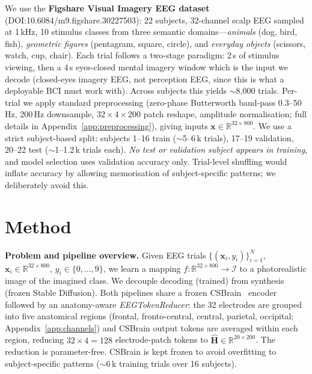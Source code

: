 \documentclass{article}
\begin{document}
We use the \textbf{Figshare Visual Imagery EEG dataset}~\citep{figshare_eeg} (DOI:10.6084/m9.figshare.30227503): 22 subjects, 32-channel scalp EEG sampled at 1\,kHz, 10 stimulus classes from three semantic domains---\emph{animals} (dog, bird, fish), \emph{geometric figures} (pentagram, square, circle), and \emph{everyday objects} (scissors, watch, cup, chair). Each trial follows a two-stage paradigm: 2\,s of stimulus viewing, then a 4\,s eyes-closed mental imagery window which is the input we decode (closed-eyes imagery EEG, not perception EEG, since this is what a deployable BCI must work with). Across subjects this yields $\sim$8{,}000 trials. Per-trial we apply standard preprocessing (zero-phase Butterworth band-pass 0.3--50\,Hz, 200\,Hz downsample, $32{\times}4{\times}200$ patch reshape, amplitude normalisation; full details in Appendix~\ref{app:preprocessing}), giving inputs $\mathbf{x}\in\mathbb{R}^{32\times 800}$. We use a strict subject-based split: subjects 1--16 train ($\sim$5--6\,k trials), 17--19 validation, 20--22 test ($\sim$1--1.2\,k trials each). \emph{No test or validation subject appears in training}, and model selection uses validation accuracy only. Trial-level shuffling would inflate accuracy by allowing memorisation of subject-specific patterns; we deliberately avoid this.

\section{Method}

\textbf{Problem and pipeline overview.} Given EEG trials $\{(\mathbf{x}_i,y_i)\}_{i=1}^N$, $\mathbf{x}_i\in\mathbb{R}^{32\times 800}$, $y_i\in\{0,\dots,9\}$, we learn a mapping $f:\mathbb{R}^{32\times 800}\to\mathcal{I}$ to a photorealistic image of the imagined class. We decouple decoding (trained) from synthesis (frozen Stable Diffusion). Both pipelines share a frozen CSBrain~\citep{zhu2024csbrain} encoder followed by an anatomy-aware \emph{EEGTokenReducer}: the 32 electrodes are grouped into five anatomical regions (frontal, fronto-central, central, parietal, occipital; Appendix~\ref{app:channels}) and CSBrain output tokens are averaged within each region, reducing $32\times 4{=}128$ electrode-patch tokens to $\hat{\mathbf{H}}\in\mathbb{R}^{20\times 200}$. The reduction is parameter-free. CSBrain is kept frozen to avoid overfitting to subject-specific patterns ($\sim$6\,k training trials over 16 subjects).
\end{document}

